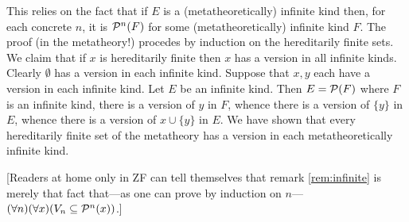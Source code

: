 \documentclass[12pt]{article}
\begin{document}
{This relies on the fact that if $E$ is a (metatheoretically) infinite kind then, for each   %
concrete $n$, it is ${\cal P}^n(F)$ for some (metatheoretically) infinite kind $F$.  The proof (in the
metatheory!) procedes by induction on the hereditarily finite sets.
We claim that if $x$ is hereditarily finite then $x$ has a version in  all
infinite kinds.  Clearly $\emptyset$ has a version in each infinite kind.  Suppose that $x,y$ each have a version in each infinite kind.
Let $E$ be an infinite kind.  Then $E = {\cal P}(F)$ where $F$ is an infinite kind, there is a version of $y$ in $F$, whence there is a version of $\{y\}$ in $E$, whence there is a version of $x \cup \{y\}$ in $E$.  We have shown that every hereditarily finite set of the metatheory has a version in each metatheoretically infinite kind.

[Readers at home only in ZF can tell themselves that remark
  \ref{rem:infinite} is merely that fact that---as one can prove by induction on $n$---$(\forall n)(\forall x)(V_n \subseteq {\cal P}^n(x))$.]

\endproof {}

}
\end{document}
